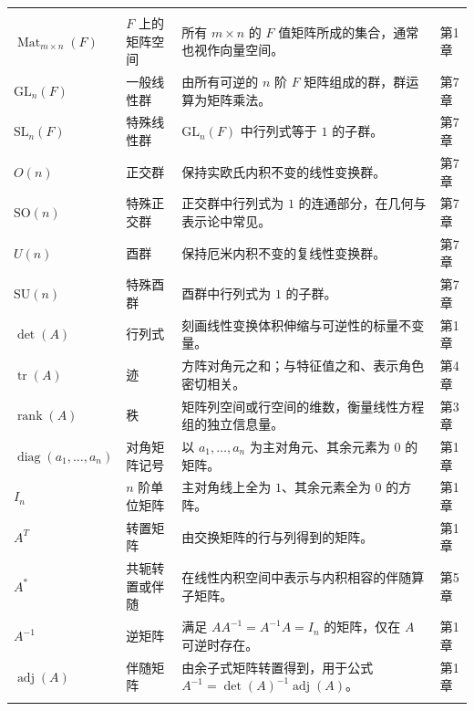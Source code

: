 \begin{longtable}{@{}>{\raggedright\arraybackslash}p{}>{\raggedright\arraybackslash}p{}>{\raggedright\arraybackslash}p{}>{\raggedright\arraybackslash}p{}@{}}
\multicolumn{4}{@{}l}{\textbf{二、矩阵与线性代数}}\\
\addlinespace[0.3em]
$\operatorname{Mat}_{m\times n}(F)$ & $F$ 上的矩阵空间 & 所有 $m\times n$ 的 $F$ 值矩阵所成的集合，通常也视作向量空间。 & 第1章 \\
$\mathrm{GL}_n(F)$ & 一般线性群 & 由所有可逆的 $n$ 阶 $F$ 矩阵组成的群，群运算为矩阵乘法。 & 第7章 \\
$\mathrm{SL}_n(F)$ & 特殊线性群 & $\mathrm{GL}_n(F)$ 中行列式等于 $1$ 的子群。 & 第7章 \\
$O(n)$ & 正交群 & 保持实欧氏内积不变的线性变换群。 & 第7章 \\
$\mathrm{SO}(n)$ & 特殊正交群 & 正交群中行列式为 $1$ 的连通部分，在几何与表示论中常见。 & 第7章 \\
$U(n)$ & 酉群 & 保持厄米内积不变的复线性变换群。 & 第7章 \\
$\mathrm{SU}(n)$ & 特殊酉群 & 酉群中行列式为 $1$ 的子群。 & 第7章 \\
$\det(A)$ & 行列式 & 刻画线性变换体积伸缩与可逆性的标量不变量。 & 第1章 \\
$\operatorname{tr}(A)$ & 迹 & 方阵对角元之和；与特征值之和、表示角色密切相关。 & 第4章 \\
$\operatorname{rank}(A)$ & 秩 & 矩阵列空间或行空间的维数，衡量线性方程组的独立信息量。 & 第3章 \\
$\operatorname{diag}(a_1,\dots,a_n)$ & 对角矩阵记号 & 以 $a_1,\dots,a_n$ 为主对角元、其余元素为 $0$ 的矩阵。 & 第1章 \\
$I_n$ & $n$ 阶单位矩阵 & 主对角线上全为 $1$、其余元素全为 $0$ 的方阵。 & 第1章 \\
$A^T$ & 转置矩阵 & 由交换矩阵的行与列得到的矩阵。 & 第1章 \\
$A^*$ & 共轭转置或伴随 & 在线性内积空间中表示与内积相容的伴随算子矩阵。 & 第5章 \\
$A^{-1}$ & 逆矩阵 & 满足 $AA^{-1}=A^{-1}A=I_n$ 的矩阵，仅在 $A$ 可逆时存在。 & 第1章 \\
$\operatorname{adj}(A)$ & 伴随矩阵 & 由余子式矩阵转置得到，用于公式 $A^{-1}=\det(A)^{-1}\operatorname{adj}(A)$。 & 第1章 \\
\addlinespace[0.6em]


\end{longtable}
